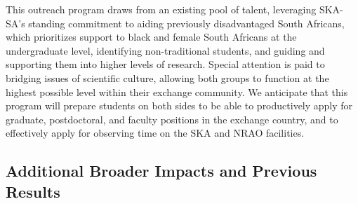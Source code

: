 \documentclass[preprint]{aastex}
\newcommand{\compress}{\vspace{-0.25in}}
\begin{document}
This outreach program draws from an existing pool of talent, 
leveraging SKA-SA's standing commitment to aiding previously disadvantaged South Africans,
which prioritizes support to black and female South Africans at the undergraduate level,
identifying non-traditional students, and guiding and supporting them into
higher levels of research.  
Special attention is paid to bridging issues of
scientific culture, allowing both groups to function at the highest possible
level within their exchange community.  We anticipate that this program will
prepare students on both sides to be able to productively apply for graduate,
postdoctoral, and faculty positions in the exchange country, and to effectively
apply for observing time on the SKA and NRAO facilities.  

\compress
\subsection{Additional Broader Impacts and Previous Results}
\label{sec:other_broader}

\end{document}
